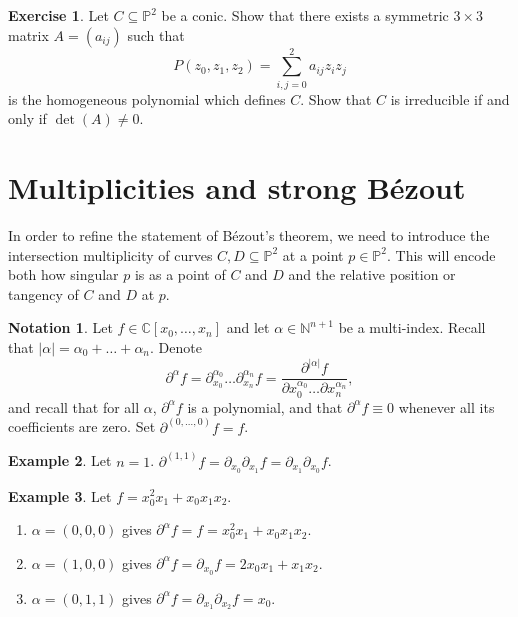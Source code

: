 \documentclass{article}
\newcommand{\N}{\mathbb{N}}
\newcommand{\C}{\mathbb{C}}
\renewcommand{\P}{\mathbb{P}}
\newcommand{\rb}[1]{\left( #1 \right)}
\renewcommand{\sb}[1]{\left[ #1 \right]}
\newcommand{\abs}[1]{\left\lvert #1 \right\rvert}
\theoremstyle{definition}\newtheorem{definition}{Definition}[section]
\theoremstyle{definition}\newtheorem{notation}[definition]{Notation}
\theoremstyle{definition}\newtheorem{remark}[definition]{Remark}
\theoremstyle{definition}\newtheorem{example}[definition]{Example}
\theoremstyle{definition}\newtheorem{fact}{Fact}
\theoremstyle{definition}\newtheorem{exercise}{Exercise}
\begin{document}
\begin{exercise}
Let $ C \subseteq \P^2 $ be a conic. Show that there exists a symmetric $ 3 \times 3 $ matrix $ A = \rb{a_{ij}} $ such that
$$ P\rb{z_0, z_1, z_2} = \sum_{i, j = 0}^2 a_{ij}z_iz_j $$
is the homogeneous polynomial which defines $ C $. Show that $ C $ is irreducible if and only if $ \det\rb{A} \ne 0 $.
\end{exercise}

\section{Multiplicities and strong Bézout}

In order to refine the statement of Bézout's theorem, we need to introduce the intersection multiplicity of curves $ C, D \subseteq \P^2 $ at a point $ p \in \P^2 $. This will encode both how singular $ p $ is as a point of $ C $ and $ D $ and the relative position or tangency of $ C $ and $ D $ at $ p $.

\begin{notation}
Let $ f \in \C\sb{x_0, \dots, x_n} $ and let $ \alpha \in \N^{n + 1} $ be a multi-index. Recall that $ \abs{\alpha} = \alpha_0 + \dots + \alpha_n $. Denote
$$ \partial^\alpha f = \partial_{x_0}^{\alpha_0} \dots \partial_{x_n}^{\alpha_n} f = \dfrac{\partial^{\abs{\alpha}} f}{\partial x_0^{\alpha_0} \dots \partial x_n^{\alpha_n}}, $$
and recall that for all $ \alpha $, $ \partial^\alpha f $ is a polynomial, and that $ \partial^\alpha f \equiv 0 $ whenever all its coefficients are zero. Set $ \partial^{\rb{0, \dots, 0}} f = f $.
\end{notation}

\begin{example}
Let $ n = 1 $. $ \partial^{\rb{1, 1}} f = \partial_{x_0} \partial_{x_1} f = \partial_{x_1} \partial_{x_0} f $.
\end{example}

\begin{example}
Let $ f = x_0^2x_1 + x_0x_1x_2 $.
\begin{enumerate}
\item $ \alpha = \rb{0, 0, 0} $ gives $ \partial^\alpha f = f = x_0^2x_1 + x_0x_1x_2 $.
\item $ \alpha = \rb{1, 0, 0} $ gives $ \partial^\alpha f = \partial_{x_0} f = 2x_0x_1 + x_1x_2 $.
\item $ \alpha = \rb{0, 1, 1} $ gives $ \partial^\alpha f = \partial_{x_1} \partial_{x_2} f = x_0 $.
\end{enumerate}
\end{example}
\end{document}

